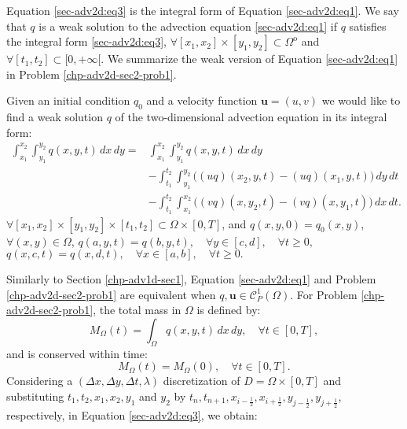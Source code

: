 Equation \eqref{sec-adv2d:eq3} is the integral form of Equation 
\eqref{sec-adv2d:eq1}. We say that ${q}$ is a weak
solution to the advection equation \eqref{sec-adv2d:eq1} if ${q}$
satisfies the integral form \eqref{sec-adv2d:eq3}, 
$\forall [x_1,x_2]\times[y_1,y_2] \subset \Omega^{\mathrm{o}}$ and 
$\forall [t_1,t_2] \subset [0,+\infty[$.
We summarize the weak version of Equation \eqref{sec-adv2d:eq1} in Problem \eqref{chp-adv2d-sec2-prob1}.
\begin{prob}
	\label{chp-adv2d-sec2-prob1}
	Given an initial condition ${q}_0$ and
	a velocity function $\boldsymbol{u} = (u,v)$
 	we would like to find a weak solution ${q}$
	of the two-dimensional advection equation in its integral form:
	\begin{align*}
		\int_{x_1}^{x_2} \int_{y_1}^{y_2}
		{q}(x, y, t) \,dx \,dy = &\int_{x_1}^{x_2} \int_{y_1}^{y_2}
		{q}(x, y, t) \,dx \,dy \\ \nonumber
		&-\int_{t_1}^{t_2} \int_{y_1}^{y_2} \bigg({(uq)}(x_2, y, t)
		-{(uq)}(x_1, y, t) \bigg) \,dy \,dt\\ \nonumber
		&-\int_{t_1}^{t_2} \int_{x_1}^{x_2} \bigg({(vq)}(x, y_2, t)
		-{(vq)}(x, y_1, t) \bigg) \,dx \,dt.
	\end{align*}
	$\forall [x_1, x_2]\times [y_1, y_2] \times[t_1, t_2] \subset \Omega \times[0,T]$, 
	and ${q}(x, y, 0) = {q}_0(x, y)$, $\forall (x, y) \in \Omega$,
   ${q}(a, y, t) = {q}(b, y, t), \quad \forall y \in [c,d],  \quad \forall t\geq 0,$
   ${q}(x, c, t) = {q}(x, d, t), \quad \forall x \in [a,b],  \quad \forall t\geq 0.$
\end{prob}
Similarly to Section \ref{chp-adv1d-sec1}, Equation \eqref{sec-adv2d:eq1} and Problem \eqref{chp-adv2d-sec2-prob1} are equivalent
when ${q}, \boldsymbol{u} \in \mathcal{C}^1_P{(\Omega)}$.
For Problem \ref{chp-adv2d-sec2-prob1}, the total mass in $\Omega$ is defined by: 
\begin{equation}
	{M}_{\Omega}(t) = \int_{\Omega} {q}(x,y,t) \,dx \,dy , \quad \forall t \in [0,T],
\end{equation}
and is conserved within time: 
\begin{equation}
	{M}_{\Omega}(t) = {M}_{\Omega}(0), \quad \forall t \in [0,T].
\end{equation}
Considering a $(\Delta x, \Delta y, \Delta t, \lambda)$ discretization of $D = \Omega \times [0,T]$ and
substituting $t_1, t_2, x_1, x_2, y_1$ and $y_2$ by 
$t_{n}, t_{n+1}, x_{i-\frac{1}{2}}, x_{i+\frac{1}{2}}, y_{j-\frac{1}{2}}, y_{j+\frac{1}{2}}$,
respectively, in Equation \eqref{sec-adv2d:eq3}, we obtain:
